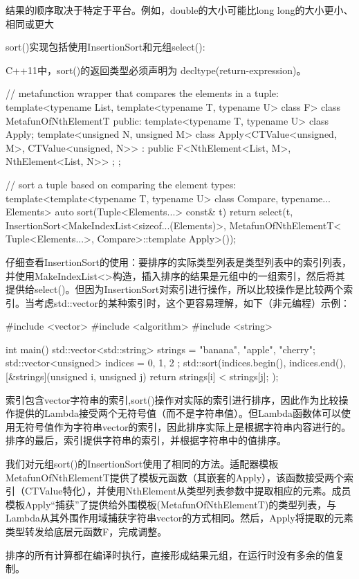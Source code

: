 \begin{notice}
结果的顺序取决于特定于平台。例如，double的大小可能比long long的大小更小、相同或更大
\end{notice}

sort()实现包括使用InsertionSort和元组select():

\begin{notice}
C++11中，sort()的返回类型必须声明为 \inlcpp{->}decltype(return-expression)。
\end{notice}

\begin{cpp}
// metafunction wrapper that compares the elements in a tuple:
template<typename List, template<typename T, typename U> class F>
class MetafunOfNthElementT {
	public:
	template<typename T, typename U> class Apply;
	template<unsigned N, unsigned M>
	class Apply<CTValue<unsigned, M>, CTValue<unsigned, N>>
	: public F<NthElement<List, M>, NthElement<List, N>> { };
};

// sort a tuple based on comparing the element types:
template<template<typename T, typename U> class Compare,
typename... Elements>
auto sort(Tuple<Elements...> const& t) {
	return select(t,
					InsertionSort<MakeIndexList<sizeof...(Elements)>,
									MetafunOfNthElementT<
												Tuple<Elements...>,
												Compare>::template Apply>());
}
\end{cpp}

仔细查看InsertionSort的使用：要排序的实际类型列表是类型列表中的索引列表，并使用MakeIndexList<>构造，插入排序的结果是元组中的一组索引，然后将其提供给select()。但因为InsertionSort对索引进行操作，所以比较操作是比较两个索引。当考虑std::vector的某种索引时，这个更容易理解，如下（非元编程）示例：

\begin{cpp}
#include <vector>
#include <algorithm>
#include <string>

int main() {
	std::vector<std::string> strings = {"banana", "apple", "cherry"};
	std::vector<unsigned> indices = { 0, 1, 2 };
	std::sort(indices.begin(), indices.end(),
			[&strings](unsigned i, unsigned j) {
				return strings[i] < strings[j];
			});
}
\end{cpp}

索引包含vector字符串的索引,sort()操作对实际的索引进行排序，因此作为比较操作提供的Lambda接受两个无符号值（而不是字符串值）。但Lambda函数体可以使用无符号值作为字符串vector的索引，因此排序实际上是根据字符串内容进行的。排序的最后，索引提供字符串的索引，并根据字符串中的值排序。

我们对元组sort()的InsertionSort使用了相同的方法。适配器模板MetafunOfNthElementT提供了模板元函数（其嵌套的Apply），该函数接受两个索引（CTValue特化），并使用NthElement从类型列表参数中提取相应的元素。成员模板Apply“捕获”了提供给外围模板(MetafunOfNthElementT)的类型列表，与Lambda从其外围作用域捕获字符串vector的方式相同。然后，Apply将提取的元素类型转发给底层元函数F，完成调整。

排序的所有计算都在编译时执行，直接形成结果元组，在运行时没有多余的值复制。

















